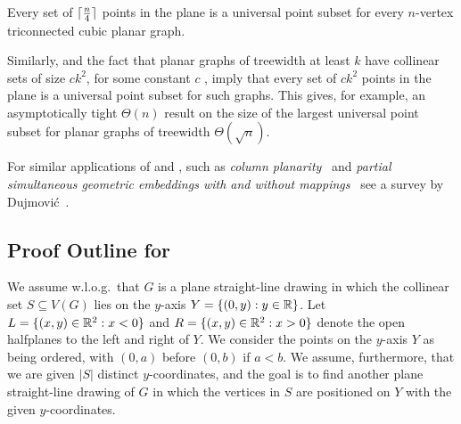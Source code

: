 \begin{cor}
Every set of ${\lceil \frac{n}{4} \rceil}$ points in the plane  is a universal
point subset for  every $n$-vertex triconnected cubic
planar graph.
\end{cor}

Similarly,  and the fact that planar graphs of
treewidth at least $k$ have collinear sets of size $ck^2$, for some
constant $c$ \cite{dalozzo.dujmovic.ea:drawing}, imply that every set
of  $c k^2$ points in the plane is a universal point subset for  such
graphs. This gives, for example, an asymptotically tight  $\Theta(n)$
result on the size of the largest universal point subset for planar
graphs of treewidth $\Theta(\sqrt{n})$. 

For similar applications of 
and , such as \emph{column
planarity}~\cite{behks-cppsge-17,dalozzo.dujmovic.ea:drawing,dujmovic:utility}
and \emph{partial simultaneous geometric embeddings with and without
mappings}~\cite{behks-cppsge-17,ddlmw-pqp-15,dujmovic:utility} see a
survey by Dujmovi\'c~\cite{dujmovic:utility}.



\subsection{Proof Outline for }

We assume w.l.o.g.\ that $G$ is a plane straight-line
drawing in which the collinear set $S\subseteq V(G)$ lies
on the $y$-axis $Y=\{(0,y):y\in\mathbb{R}\}$. Let
$L=\{(x,y)\in\mathbb{R}^2:x<0\}$ and $R=\{(x,y)\in\mathbb{R}^2: x >0\}$ denote the open
halfplanes to the left and right of $Y$.
We consider the points on the $y$-axis $Y$ as being ordered,
with $(0,a)$ before $(0,b)$ if $a<b$. 
We
assume, furthermore, that we are given $|S|$ distinct $y$-coordinates,
and the goal is to find another plane straight-line drawing of $G$ in
which the vertices in $S$ are positioned on $Y$ with the given $y$-coordinates.

